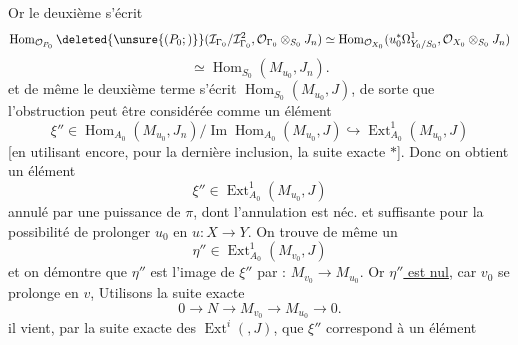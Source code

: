 Or le  deuxième  s'écrit
\[
\operatorname{Hom}_{\mathcal{O}_{P_0}}\deleted{\unsure{(P_0;)}}
(\mathcal{I}_{\Gamma_0}/\mathcal{I}_{\Gamma_0}^{2},\mathcal{O}_{\Gamma_0}\otimes_{S_0}J_n)
\simeq\operatorname{Hom}_{\mathcal{O}_{X_0}}(u_0^*\Omega^1_{Y_0/S_0},\mathcal{O}_{X_0}\otimes_{S_0}J_n)
\]
\[
\simeq\operatorname{Hom}_{S_0}(M_{u_0},J_n).
\]
et de même le deuxième terme s'écrit
$\operatorname{Hom}_{S_0}(M_{u_0},J)$, de sorte que l'obstruction
peut être considérée comme un élément
\[
\xi''\in\operatorname{Hom}_{A_0}(M_{u_0},J_n)/\operatorname{Im}\operatorname{Hom}_{A_0}(M_{u_0},J)
\hookrightarrow\operatorname{Ext}^{1}_{A_0}(M_{u_0},J)
\]
[en utilisant encore, pour la dernière inclusion,
la suite exacte $*$]. Donc on obtient un
élément
\[
\xi''\in\operatorname{Ext}^{1}_{A_0}(M_{u_0},J)
\]
annulé par une puissance de $\pi$, dont l'annulation
est néc. et suffisante pour la possibilité de
prolonger $u_0$ en $u:X\longrightarrow Y$. On trouve de
même un
\[
\eta''\in\operatorname{Ext}^{1}_{A_0}(M_{v_0},J)
\]
et on démontre que $\eta''$ est l'image de $\xi''$
par : $M_{v_0}\longrightarrow M_{u_0}$. Or \uline{$\eta''$ est nul}, car
$v_0$ se prolonge en $v$,  Utilisons la suite exacte
\[
0\longrightarrow N\longrightarrow M_{v_0}\longrightarrow M_{u_0}\longrightarrow0.
\]
il vient, par la suite exacte des $\operatorname{Ext}^{i}(,J)$, que
$\xi''$ correspond à un élément
